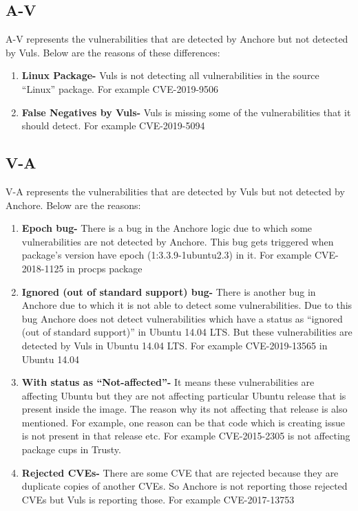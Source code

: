 \documentclass[a4paper,num-refs]{oup-contemporary}
\begin{document}
\subsection{A-V}

A-V represents the vulnerabilities that are detected by Anchore but not detected by Vuls. Below are the reasons 
of these differences:
\begin{enumerate}

	\item\textbf{Linux Package-} Vuls is not detecting all vulnerabilities in the source “Linux” package. 
		For example CVE-2019-9506
	\item\textbf{False Negatives by Vuls-} Vuls is missing some of the vulnerabilities that it should detect. 
		For example CVE-2019-5094
\end{enumerate}

\subsection{V-A}
V-A represents the vulnerabilities that are detected by Vuls but not detected by Anchore. Below are the reasons:
\begin{enumerate}
\item\textbf{Epoch bug-} There is a bug in the Anchore logic due to which some vulnerabilities are not detected 
	by Anchore. This bug gets triggered when package’s version have epoch (1:3.3.9-1ubuntu2.3)  in it. 
		For example CVE-2018-1125 in procps package
\item\textbf{Ignored (out of standard support) bug-} There is another bug in Anchore due to which it is not 
	able to detect some vulnerabilities. Due to this bug Anchore does not detect vulnerabilities which 
		have a status as “ignored (out of standard support)” in Ubuntu 14.04 LTS. But these vulnerabilities 
		are detected by Vuls in Ubuntu 14.04 LTS. For example CVE-2019-13565 in Ubuntu 14.04
\item\textbf{With status as “Not-affected”-}  It means these vulnerabilities are affecting Ubuntu but they are not 
	affecting particular Ubuntu release that is present inside the image. The reason why its not affecting that 
		release is also mentioned. For example, one reason can be that code which is creating issue is not 
		present in that release etc. For example CVE-2015-2305 is not affecting package cups in Trusty.
\item\textbf{Rejected CVEs-} There are some CVE that are rejected because they are duplicate copies of another CVEs. 
	So Anchore is not reporting those rejected CVEs but Vuls is reporting those. For example CVE-2017-13753
	\end{enumerate}
\end{document}
